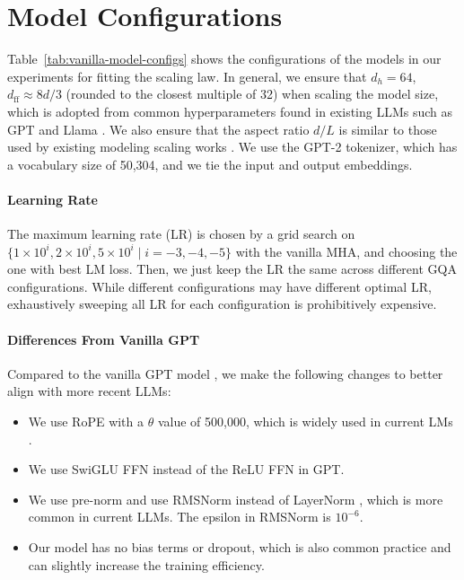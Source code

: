 \section{Model Configurations}
\label{sec:appendix-model-config}

Table~\ref{tab:vanilla-model-configs} shows the configurations of the models in our experiments for fitting the scaling law. In general, we ensure that $d_h=64$, $d_\text{ff} \approx 8d/3$ (rounded to the closest multiple of 32) when scaling the model size, which is adopted from common hyperparameters found in existing LLMs such as GPT \citep{gpt} and Llama \citep{llama3}. We also ensure that the aspect ratio $d/L$ is similar to those used by existing modeling scaling works \citep{pythia,chinchilla,qwen2.5}.
We use the GPT-2 tokenizer, which has a vocabulary size of 50,304, and we tie the input and output embeddings. 

\paragraph{Learning Rate}

The maximum learning rate (LR) is chosen by a grid search on $\{1\times10^i,2\times 10^i,5\times 10^i\mid i=-3, -4, -5\}$ with the vanilla MHA, and choosing the one with best LM loss. Then, we just keep the LR the same across different GQA configurations. While different configurations may have different optimal LR, exhaustively sweeping all LR for each configuration is prohibitively expensive.

\paragraph{Differences From Vanilla GPT}

Compared to the vanilla GPT model \citep{gpt}, we make the following changes to better align with more recent LLMs:
\begin{itemize}
    \item We use RoPE \citep{rope} with a $\theta$ value of 500,000, which is widely used in current LMs \citep{llama3}.
    \item We use SwiGLU FFN instead of the ReLU FFN in GPT.
    \item We use pre-norm \citep{pre-ln} and use RMSNorm \citep{rmsnorm} instead of LayerNorm \citep{layernorm}, which is more common in current LLMs. The epsilon in RMSNorm is $10^{-6}$.
    \item Our model has no bias terms or dropout, which is also common practice and can slightly increase the training efficiency.
\end{itemize}

